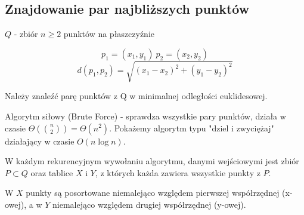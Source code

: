 \subsection{Znajdowanie par najbliższych punktów}
$Q$ - zbiór $n\geq 2$ punktów na płaszczyźnie 

$$p_1= (x_1,y_1)\ p_2= (x_2,y_2)$$
$$d(p_1,p_2)= \sqrt{(x_1-x_2)^2+(y_1-y_2)^2}$$

Należy znaleźć parę punktów z Q w minimalnej odległości euklidesowej.

Algorytm siłowy (Brute Force) - sprawdza wszystkie pary punktów, działa w czasie $\Theta(\binom{n}{2})=\Theta(n^2)$. Pokażemy algorytm typu "dziel i zwyciężaj" działający w czasie $O(n \log n)$.

W każdym rekurencyjnym wywołaniu algorytmu, danymi wejściowymi jest zbiór $P\subset Q$ oraz tablice $X$ i $Y$, z których każda zawiera wszystkie punkty z $P$.

W $X$ punkty są posortowane niemalejąco względem pierwszej współrzędnej (x-owej), a w $Y$ niemalejąco względem drugiej współrzędnej (y-owej).

